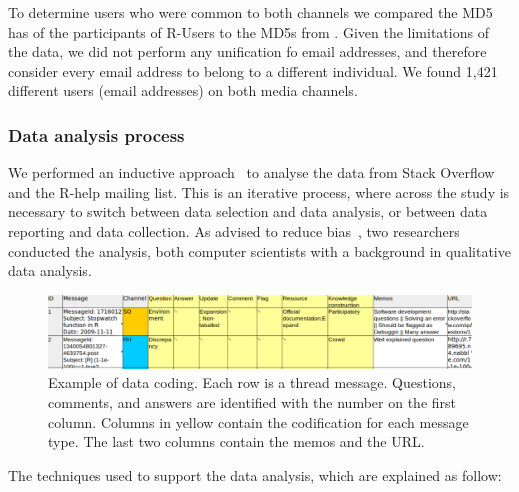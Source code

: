 To determine users who were common to both channels we compared the MD5 has of the participants of R-Users to the MD5s from \SO. Given the limitations of the
\SO data, we did not perform any unification fo email addresses, and therefore consider every email address to belong to a different individual. 
We found 1,421 different users (email addresses) on both media channels.




\subsubsection{Data analysis process}
\label{sec:dap}

    We performed an inductive approach~\cite{Runeson2012} to analyse the data from Stack Overflow and the R-help mailing list. 
    This is an iterative process, where across the study is necessary to switch between data selection and data analysis, or between data reporting and data collection.
    As advised to reduce bias~\cite{Runeson2012}, two researchers conducted the analysis, both computer scientists with a background in qualitative data analysis.
    
    \begin{figure}[htbp]
    	\centering
    	\includegraphics[width=.95\textwidth]{Figures/CodingExample}
    	\caption{Example of data coding. Each row is a thread message. Questions, comments, and answers are identified with the number on the first column. Columns in yellow contain the codification for each message type. The last two columns contain the memos and the URL.}
    	\label{fig:CodingExample}
    \end{figure}

    The techniques used to support the data analysis, which are explained as follow:

